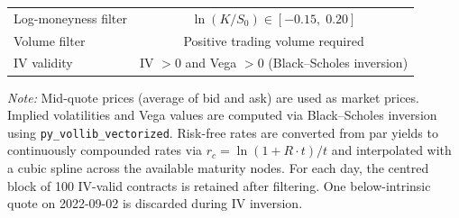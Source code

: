 \begin{table}[htbp]
\begin{tabular}{lcc}
    \quad Log-moneyness filter         & \multicolumn{2}{c}{$\ln(K/S_0) \in [-0.15,\; 0.20]$} \\
    \quad Volume filter                & \multicolumn{2}{c}{Positive trading volume required} \\
    \quad IV validity                  & \multicolumn{2}{c}{IV $> 0$ and Vega $> 0$ (Black--Scholes inversion)} \\
    \bottomrule
  \end{tabular}
  \begin{tablenotes}
    \small
    \item \textit{Note:} Mid-quote prices (average of bid and ask) are used as market prices. Implied volatilities and Vega values are computed via Black--Scholes inversion using \texttt{py\_vollib\_vectorized}. Risk-free rates are converted from par yields to continuously compounded rates via $r_c = \ln(1 + R \cdot t)/t$ and interpolated with a cubic spline across the available maturity nodes. For each day, the centred block of 100 IV-valid contracts is retained after filtering. One below-intrinsic quote on 2022-09-02 is discarded during IV inversion.
  \end{tablenotes}
\end{table}
